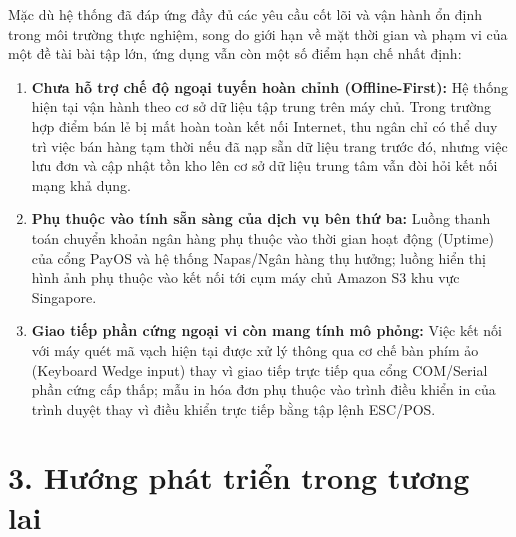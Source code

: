 Mặc dù hệ thống đã đáp ứng đầy đủ các yêu cầu cốt lõi và vận hành ổn định trong môi trường thực nghiệm, song do giới hạn về mặt thời gian và phạm vi của một đề tài bài tập lớn, ứng dụng vẫn còn một số điểm hạn chế nhất định:
\begin{enumerate}[label=\arabic*., leftmargin=1.5cm]
    \item \textbf{Chưa hỗ trợ chế độ ngoại tuyến hoàn chỉnh (Offline-First):} Hệ thống hiện tại vận hành theo cơ sở dữ liệu tập trung trên máy chủ. Trong trường hợp điểm bán lẻ bị mất hoàn toàn kết nối Internet, thu ngân chỉ có thể duy trì việc bán hàng tạm thời nếu đã nạp sẵn dữ liệu trang trước đó, nhưng việc lưu đơn và cập nhật tồn kho lên cơ sở dữ liệu trung tâm vẫn đòi hỏi kết nối mạng khả dụng.
    \item \textbf{Phụ thuộc vào tính sẵn sàng của dịch vụ bên thứ ba:} Luồng thanh toán chuyển khoản ngân hàng phụ thuộc vào thời gian hoạt động (Uptime) của cổng PayOS và hệ thống Napas/Ngân hàng thụ hưởng; luồng hiển thị hình ảnh phụ thuộc vào kết nối tới cụm máy chủ Amazon S3 khu vực Singapore.
    \item \textbf{Giao tiếp phần cứng ngoại vi còn mang tính mô phỏng:} Việc kết nối với máy quét mã vạch hiện tại được xử lý thông qua cơ chế bàn phím ảo (Keyboard Wedge input) thay vì giao tiếp trực tiếp qua cổng COM/Serial phần cứng cấp thấp; mẫu in hóa đơn phụ thuộc vào trình điều khiển in của trình duyệt thay vì điều khiển trực tiếp bằng tập lệnh ESC/POS.
\end{enumerate}

\section*{3. Hướng phát triển trong tương lai}
\label{sec:huong_phat_trien}

